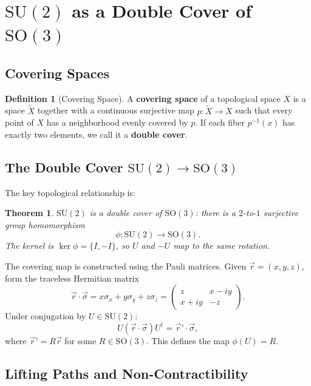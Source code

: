 \documentclass[11pt,a4paper]{article}
\theoremstyle{definition}
\newtheorem{definition}{Definition}[section]
\theoremstyle{plain}
\newtheorem{theorem}{Theorem}[section]
\theoremstyle{remark}
\begin{document}
\section{$\mathrm{SU}(2)$ as a Double Cover of $\mathrm{SO}(3)$}

\subsection{Covering Spaces}

\begin{definition}[Covering Space]
    A \textbf{covering space} of a topological space $X$ is a space $\tilde{X}$ together with a continuous surjective map $p: \tilde{X} \to X$ such that every point of $X$ has a neighborhood evenly covered by $p$. If each fiber $p^{-1}(x)$ has exactly two elements, we call it a \textbf{double cover}.
\end{definition}

\subsection{The Double Cover $\mathrm{SU}(2) \to \mathrm{SO}(3)$}

The key topological relationship is:
\begin{theorem}
    $\mathrm{SU}(2)$ is a double cover of $\mathrm{SO}(3)$: there is a $2$-to-$1$ surjective group homomorphism
    \[
        \phi: \mathrm{SU}(2) \longrightarrow \mathrm{SO}(3).
    \]
    The kernel is $\ker\phi = \{I, -I\}$, so $U$ and $-U$ map to the same rotation.
\end{theorem}

The covering map is constructed using the Pauli matrices. Given $\vec{r} = (x,y,z)$, form the traceless Hermitian matrix
\[
    \vec{r} \cdot \vec{\sigma} = x\sigma_x + y\sigma_y + z\sigma_z = \begin{pmatrix} z & x - iy \\ x + iy & -z \end{pmatrix}.
\]
Under conjugation by $U \in \mathrm{SU}(2)$:
\[
    U(\vec{r}\cdot\vec{\sigma})U^\dagger = \vec{r}' \cdot \vec{\sigma},
\]
where $\vec{r}' = R\vec{r}$ for some $R \in \mathrm{SO}(3)$. This defines the map $\phi(U) = R$.

\subsection{Lifting Paths and Non-Contractibility}
\end{document}
